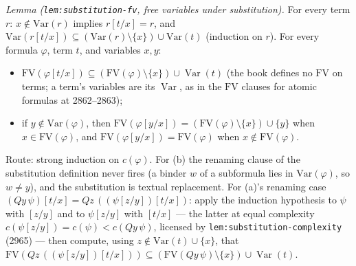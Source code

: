 \emph{Lemma (\texttt{lem:substitution-fv}, free variables under
substitution).}  For every term \(r\): \(x\notin\mathrm{Var}(r)\) implies
\(r[t/x]=r\), and
\(\mathrm{Var}(r[t/x])\subseteq(\mathrm{Var}(r)\setminus\{x\})\cup\mathrm{Var}(t)\)
(induction on \(r\)).  For every formula \(\varphi\), term \(t\), and variables
\(x,y\):
\begin{itemize}
\item[(a)] \(\mathrm{FV}(\varphi[t/x])\subseteq
      (\mathrm{FV}(\varphi)\setminus\{x\})\cup\operatorname{Var}(t)\)
      (the book defines no \(\mathrm{FV}\) on terms; a term's variables
      are its \(\operatorname{Var}\), as in the \(\mathrm{FV}\) clauses for
      atomic formulas at 2862--2863);
\item[(b)] if \(y\notin\mathrm{Var}(\varphi)\), then
      \(\mathrm{FV}(\varphi[y/x])=(\mathrm{FV}(\varphi)\setminus\{x\})\cup\{y\}\)
      when \(x\in\mathrm{FV}(\varphi)\), and
      \(\mathrm{FV}(\varphi[y/x])=\mathrm{FV}(\varphi)\) when
      \(x\notin\mathrm{FV}(\varphi)\).
\end{itemize}
Route: strong induction on \(c(\varphi)\).  For (b) the renaming clause of the
substitution definition never fires (a binder \(w\) of a subformula lies in
\(\mathrm{Var}(\varphi)\), so \(w\ne y\)), and the substitution is textual
replacement.  For (a)'s renaming case
\((Qy\,\psi)[t/x]=Qz\,((\psi[z/y])[t/x])\): apply the induction hypothesis to
\(\psi\) with \([z/y]\) and to \(\psi[z/y]\) with \([t/x]\) --- the latter at
equal complexity \(c(\psi[z/y])=c(\psi)<c(Qy\,\psi)\), licensed by
\texttt{lem:substitution-complexity} (2965) --- then compute, using
\(z\notin\mathrm{Var}(t)\cup\{x\}\), that
\(\mathrm{FV}(Qz\,((\psi[z/y])[t/x]))\subseteq
(\mathrm{FV}(Qy\,\psi)\setminus\{x\})\cup\operatorname{Var}(t)\).

